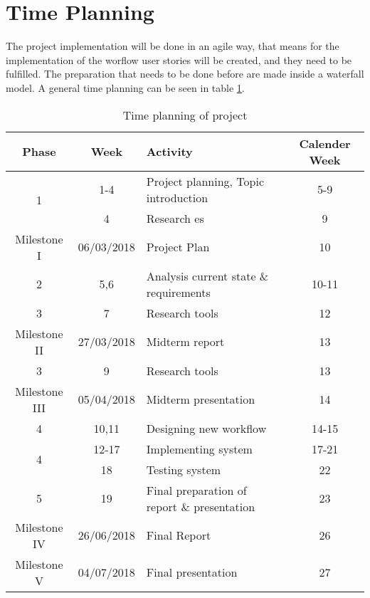 \section{Time Planning}
The project implementation will be done in an agile way, that means for the implementation of the worflow user stories will be created, and they need to be fulfilled. The preparation that needs to be done before are made inside a waterfall model. A general time planning can be seen in table \ref{tab:timeplanning}. 
\begin{table} [!h]
	\centering
	\begin{tabular}{|c|c|l|c|} \hline
		\rowcolor{Gray}Phase & Week & Activity & Calender Week \\ \hline
		\multirow{2}{*}{1} & 1-4 & Project planning, Topic introduction & 5-9 \\
		& 4 & Research \gls{es} & 9 \\	\hline	
		Milestone I & 06/03/2018 & Project Plan & 10\\ \hline
		2 & 5,6 & Analysis current state \& requirements & 10-11  \\ \hline
		3 & 7 & Research tools & 12 \\ \hline
		Milestone II & 27/03/2018 & Midterm report & 13\\ \hline
		3 & 9 & Research tools & 13 \\ \hline
		Milestone III & 05/04/2018 & Midterm presentation & 14 \\ \hline
		4 & 10,11 & Designing new workflow & 14-15 \\
		\multirow{2}{*}{4} & 12-17 & Implementing system & 17-21 \\
		& 18 & Testing system & 22 \\ \hline
		5 & 19 & Final preparation of report \& presentation & 23 \\ \hline
		Milestone IV & 26/06/2018 & Final Report & 26\\ \hline
		Milestone V & 04/07/2018 & Final presentation & 27 \\ \hline
	\end{tabular}
	\caption{Time planning of project}
	\label{tab:timeplanning}
\end{table}



